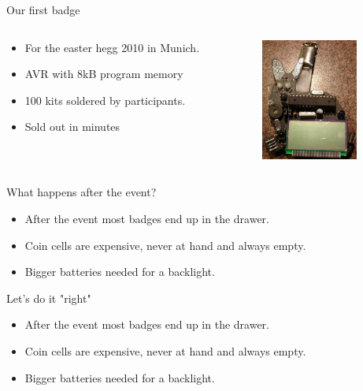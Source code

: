 \documentclass{beamer}
\begin{document}
\begin{frame}{Our first badge}
  \begin{columns}
    \begin{column}{6cm}
        \begin{itemize}
	    \item For the easter hegg 2010 in Munich.
	    \item AVR with 8kB program memory
	    \item 100 kits soldered by participants.
	    \item Sold out in minutes
	\end{itemize}
    \end{column}
    \begin{column}{6cm}
        \includegraphics[height=4cm]{bilder/ehaserl.jpg}\\
    \end{column}
  \end{columns}
  \end{frame}
\begin{frame}{What happens after the event?}
	\begin{itemize}
		\item After the event most badges end up in the drawer.
		\item Coin cells are expensive, never at hand and always empty.
		\item Bigger batteries needed for a backlight.
	\end{itemize}
\end{frame}
\begin{frame}{Let's do it "right"}
	\begin{itemize}
		\item After the event most badges end up in the drawer.
		\item Coin cells are expensive, never at hand and always empty.
		\item Bigger batteries needed for a backlight.
	\end{itemize}
\end{frame}
\end{document}
